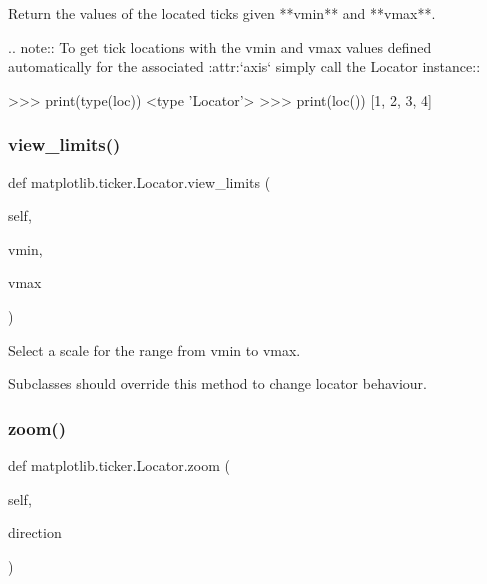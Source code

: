 \begin{DoxyVerb}Return the values of the located ticks given **vmin** and **vmax**.

.. note::
    To get tick locations with the vmin and vmax values defined
    automatically for the associated :attr:`axis` simply call
    the Locator instance::

>>> print(type(loc))
<type 'Locator'>
>>> print(loc())
[1, 2, 3, 4]\end{DoxyVerb}
 \mbox{\label{classmatplotlib_1_1ticker_1_1Locator_a91e8853577056222536f93adf1b397f9}} 
\subsubsection{\texorpdfstring{view\+\_\+limits()}{view\_limits()}}
{\footnotesize\ttfamily def matplotlib.\+ticker.\+Locator.\+view\+\_\+limits (\begin{DoxyParamCaption}\item[{}]{self,  }\item[{}]{vmin,  }\item[{}]{vmax }\end{DoxyParamCaption})}

\begin{DoxyVerb}Select a scale for the range from vmin to vmax.

Subclasses should override this method to change locator behaviour.
\end{DoxyVerb}
 \mbox{\label{classmatplotlib_1_1ticker_1_1Locator_ac647739f81ccbff8c008cd024ff1ce3f}} 
\subsubsection{\texorpdfstring{zoom()}{zoom()}}
{\footnotesize\ttfamily def matplotlib.\+ticker.\+Locator.\+zoom (\begin{DoxyParamCaption}\item[{}]{self,  }\item[{}]{direction }\end{DoxyParamCaption})}

